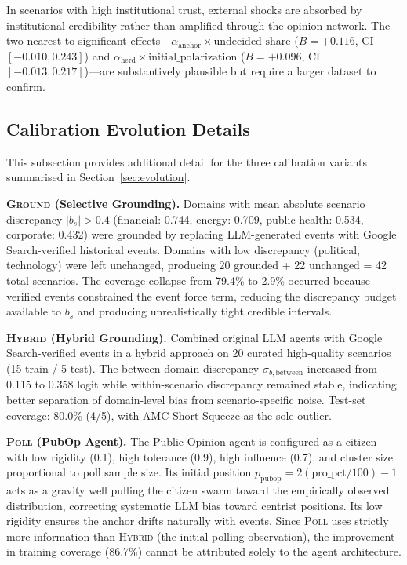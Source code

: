 \documentclass[12pt]{article}
\begin{document}
In scenarios with high institutional trust, external shocks are absorbed by institutional credibility rather than amplified through the opinion network. The two nearest-to-significant effects---$\alpha_{\text{anchor}} \times \text{undecided\_share}$ ($B = +0.116$, CI $[-0.010, 0.243]$) and $\alpha_{\text{herd}} \times \text{initial\_polarization}$ ($B = +0.096$, CI $[-0.013, 0.217]$)---are substantively plausible but require a larger dataset to confirm.

\subsection{Calibration Evolution Details}
\label{app:evolution_details}

This subsection provides additional detail for the three calibration variants summarised in Section~\ref{sec:evolution}.

\textbf{\textsc{Ground} (Selective Grounding).} Domains with mean absolute scenario discrepancy $|b_s| > 0.4$ (financial: 0.744, energy: 0.709, public health: 0.534, corporate: 0.432) were grounded by replacing LLM-generated events with Google Search-verified historical events. Domains with low discrepancy (political, technology) were left unchanged, producing 20 grounded + 22 unchanged = 42 total scenarios. The coverage collapse from 79.4\% to 2.9\% occurred because verified events constrained the event force term, reducing the discrepancy budget available to $b_s$ and producing unrealistically tight credible intervals.

\textbf{\textsc{Hybrid} (Hybrid Grounding).} Combined original LLM agents with Google Search-verified events in a hybrid approach on 20 curated high-quality scenarios (15 train / 5 test). The between-domain discrepancy $\sigma_{b,\text{between}}$ increased from 0.115 to 0.358 logit while within-scenario discrepancy remained stable, indicating better separation of domain-level bias from scenario-specific noise. Test-set coverage: 80.0\% (4/5), with AMC Short Squeeze as the sole outlier.

\textbf{\textsc{Poll} (PubOp Agent).} The Public Opinion agent is configured as a citizen with low rigidity (0.1), high tolerance (0.9), high influence (0.7), and cluster size proportional to poll sample size. Its initial position $p_{\text{pubop}} = 2 (\text{pro\_pct}/100) - 1$ acts as a gravity well pulling the citizen swarm toward the empirically observed distribution, correcting systematic LLM bias toward centrist positions. Its low rigidity ensures the anchor drifts naturally with events. Since \textsc{Poll} uses strictly more information than \textsc{Hybrid} (the initial polling observation), the improvement in training coverage (86.7\%) cannot be attributed solely to the agent architecture.
\end{document}
